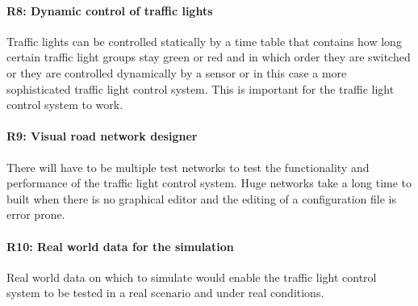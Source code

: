 \paragraph{R8: Dynamic control of traffic lights} Traffic lights can be controlled statically by a time table that contains how long certain traffic light groups stay green or red and in which order they are switched or they are controlled dynamically by a sensor or in this case a more sophisticated traffic light control system. This is important for the traffic light control system to work.

\paragraph{R9: Visual road network designer} There will have to be multiple test networks to test the functionality and performance of the traffic light control system. Huge networks take a long time to built when there is no graphical editor and the editing of a configuration file is error prone.

\paragraph{R10: Real world data for the simulation} Real world data on which to simulate would enable the traffic light control system to be tested in a real scenario and under real conditions.